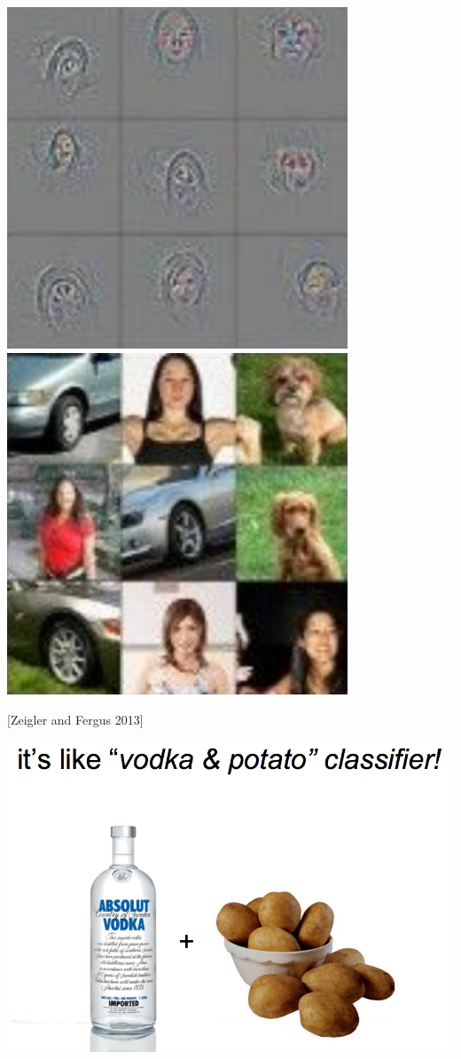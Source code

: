 {\vfill
\centerline{\includegraphics[width = 4.0in]{../images/Deconv6a} \hfill \includegraphics[width=4.0in]{../images/Deconv6b}}

\vfill
\centerline{[Zeigler and Fergus 2013]}

\slide{}
\centerline{\includegraphics[width = 7.5in]{../images/Potato}}

}
